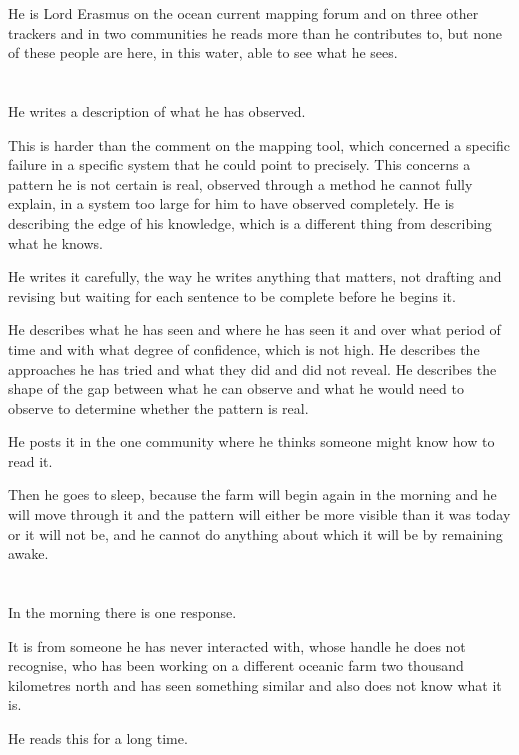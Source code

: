 He is Lord Erasmus on the ocean current mapping
forum and on three other trackers and in two
communities he reads more than he contributes to,
but none of these people are here, in this water,
able to see what he sees.

\section{}

He writes a description of what he has observed.

This is harder than the comment on the mapping
tool, which concerned a specific failure in a
specific system that he could point to precisely.
This concerns a pattern he is not certain is real,
observed through a method he cannot fully explain,
in a system too large for him to have observed
completely. He is describing the edge of his
knowledge, which is a different thing from
describing what he knows.

He writes it carefully, the way he writes anything
that matters, not drafting and revising but waiting
for each sentence to be complete before he begins it.

He describes what he has seen and where he has seen
it and over what period of time and with what degree
of confidence, which is not high. He describes the
approaches he has tried and what they did and did
not reveal. He describes the shape of the gap between
what he can observe and what he would need to observe
to determine whether the pattern is real.

He posts it in the one community where he thinks
someone might know how to read it.

Then he goes to sleep, because the farm will begin
again in the morning and he will move through it
and the pattern will either be more visible than
it was today or it will not be, and he cannot do
anything about which it will be by remaining awake.

\section{}

In the morning there is one response.

It is from someone he has never interacted with,
whose handle he does not recognise, who has been
working on a different oceanic farm two thousand
kilometres north and has seen something similar
and also does not know what it is.

He reads this for a long time.


